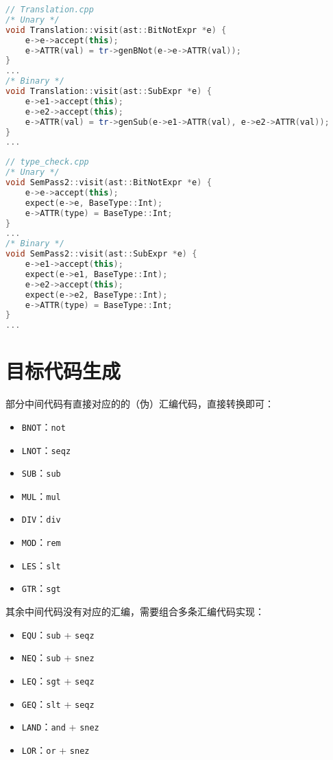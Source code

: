 \documentclass[a4paper]{article}
\begin{document}
\begin{lstlisting}[language=c++]
// Translation.cpp
/* Unary */
void Translation::visit(ast::BitNotExpr *e) {
    e->e->accept(this);
    e->ATTR(val) = tr->genBNot(e->e->ATTR(val));
}
...
/* Binary */
void Translation::visit(ast::SubExpr *e) {
    e->e1->accept(this);
    e->e2->accept(this);
    e->ATTR(val) = tr->genSub(e->e1->ATTR(val), e->e2->ATTR(val));
}
...
\end{lstlisting}

\begin{lstlisting}[language=c++]
// type_check.cpp
/* Unary */
void SemPass2::visit(ast::BitNotExpr *e) {
    e->e->accept(this);
    expect(e->e, BaseType::Int);
    e->ATTR(type) = BaseType::Int;
}
...
/* Binary */
void SemPass2::visit(ast::SubExpr *e) {
    e->e1->accept(this);
    expect(e->e1, BaseType::Int);
    e->e2->accept(this);
    expect(e->e2, BaseType::Int);
    e->ATTR(type) = BaseType::Int;
}
...
\end{lstlisting}

\section{目标代码生成}

部分中间代码有直接对应的的（伪）汇编代码，直接转换即可：

\begin{itemize}
    \item \texttt{BNOT}：\texttt{not}
    \item \texttt{LNOT}：\texttt{seqz}
    \item \texttt{SUB}：\texttt{sub}
    \item \texttt{MUL}：\texttt{mul}
    \item \texttt{DIV}：\texttt{div}
    \item \texttt{MOD}：\texttt{rem}
    \item \texttt{LES}：\texttt{slt}
    \item \texttt{GTR}：\texttt{sgt}
\end{itemize}

其余中间代码没有对应的汇编，需要组合多条汇编代码实现：

\begin{itemize}
    \item \texttt{EQU}：\texttt{sub} + \texttt{seqz}
    \item \texttt{NEQ}：\texttt{sub} + \texttt{snez}
    \item \texttt{LEQ}：\texttt{sgt} + \texttt{seqz}
    \item \texttt{GEQ}：\texttt{slt} + \texttt{seqz}
    \item \texttt{LAND}：\texttt{and} + \texttt{snez}
    \item \texttt{LOR}：\texttt{or} + \texttt{snez}
\end{itemize}
\end{document}
